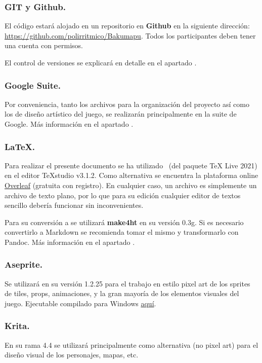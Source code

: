\subsubsection{GIT y Github.}
El código estará alojado en un repositorio  en \textbf{Github} en la siguiente dirección: \url{https://github.com/polirritmico/Bakumapu}. Todos los participantes deben tener una cuenta con permisos.

El control de versiones se explicará en detalle en el apartado .

\subsubsection{Google Suite.}
Por conveniencia, tanto los archivos para la organización del proyecto así como los de diseño artístico del juego, se realizarán principalmente en la suite de Google. Más información en el apartado .

\subsubsection{LaTeX.}
Para realizar el presente documento se ha utilizado \LaTeXe\ (del paquete TeX Live 2021) en el editor TeXstudio v3.1.2. Como alternativa se encuentra la plataforma online \href{https://www.overleaf.com/}{Overleaf} (gratuita con registro). En cualquier caso, un archivo  es simplemente un archivo de texto plano, por lo que para su edición cualquier editor de textos sencillo debería funcionar sin inconvenientes.

Para su conversión a  se utilizará \textbf{make4ht} en su versión 0.3g. Si es necesario convertirlo a Markdown se recomienda tomar el mismo  y transformarlo con Pandoc. Más información en el apartado .

\subsubsection{Aseprite.}
Se utilizará en su versión 1.2.25 para el trabajo en estilo pixel art de los sprites de tiles, props, animaciones,  y la gran mayoría de los elementos visuales del juego. Ejecutable compilado para Windows \href{https://drive.google.com/drive/folders/1DPhGeg7WzV9j81u3B5isgsXqoMtfd_Uv?usp=sharing}{aquí}.

\subsubsection{Krita.}
En su rama 4.4 se utilizará principalmente como alternativa (no pixel art) para el diseño visual de los personajes, mapas, etc.

